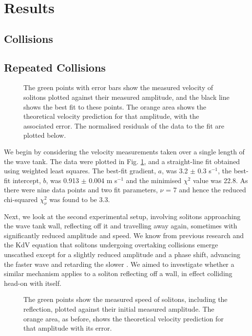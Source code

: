 \documentclass[10pt, twocolumn]{revtex4}    %
\begin{document}

\section{Results} \label{Results}

\subsection{Collisions}

\subsection{Repeated Collisions}

\begin{figure}[h]
\caption{The green points with error bars show the measured velocity of solitons plotted against their measured amplitude, and the black line shows the best fit to these points. The orange area shows the theoretical velocity prediction for that amplitude, with the associated error. The normalised residuals of the data to the fit are plotted below.}
\label{Graph1}
\end{figure}

We begin by considering the velocity measurements taken over a single length of the wave tank. The data were plotted in Fig. \ref{Graph1}, and a straight-line fit obtained using weighted least squares. The best-fit gradient, $a$, was 3.2 $\pm$ 0.3 s$^{-1}$, the best-fit intercept, $b$, was 0.913 $\pm$ 0.004 m s$^{-1}$ and the minimised $\chi^2$ value was 22.8. As there were nine data points and two fit parameters, $\nu$ = 7 and hence the reduced chi-squared $\chi_\nu^2$ was found to be 3.3. 


Next, we look at the second experimental setup, involving solitons approaching the wave tank wall, reflecting off it and travelling away again, sometimes with significantly reduced amplitude and speed. We know from previous research and the KdV equation that solitons undergoing overtaking collisions emerge unscathed except for a slightly reduced amplitude and a phase shift, advancing the faster wave and retarding the slower \cite{Segur}. We aimed to investigate whether a similar mechanism applies to a soliton reflecting off a wall, in effect colliding head-on with itself. 

\begin{figure}[h]
\caption{The green points show the measured speed of solitons, including the reflection, plotted against their initial measured amplitude. The orange area, as before, shows the theoretical velocity prediction for that amplitude with its error.}
\label{Graph2}
\end{figure}
\end{document}
